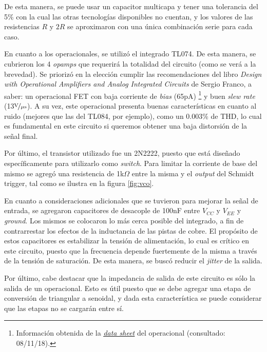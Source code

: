 \documentclass[../../tc_tp6_main.tex]{subfiles}
\begin{document}
De esta manera, se puede usar un capacitor multicapa y tener una tolerancia del 5\% con la cual las otras tecnolog\'ias disponibles no cuentan, y los valores de las resistencias $R$ y $2R$ se aproximaron con una \'unica combinaci\'on serie para cada caso.\par

En cuanto a los operacionales, se utiliz\'o el integrado TL074. De esta manera, se cubrieron los 4 \textit{opamps} que requerir\'a la totalidad del circuito (como se ver\'a a la brevedad). Se prioriz\'o en la elecci\'on cumplir las recomendaciones del libro \textit{Design with Operational Amplifiers and Analog Integrated Circuits} de Sergio Franco, a saber: un operacional FET con baja corriente de \textit{bias} (65pA) \footnote{Informaci\'on obtenida de la \href{http://www.ti.com/lit/ds/symlink/tl074.pdf}{\underline{\textit{data sheet}}} del operacional (consultado: 08/11/18).} y buen \textit{slew rate} (13$\nicefrac{\mathrm{V}}{\mu\mathrm{s}}$). A su vez, este operacional presenta buenas caracter\'isticas en cuanto al ruido (mejores que las del TL084, por ejemplo), como un 0.003\% de THD, lo cual es fundamental en este circuito si queremos obtener una baja distorsi\'on de la se\~nal final.\par 

Por \'ultimo, el transistor utilizado fue un 2N2222, puesto que est\'a dise\~nado espec\'ificamente para utilizarlo como \textit{switch}. Para limitar la corriente de base del mismo se agreg\'o una resistencia de 1k$\Omega$ entre la misma y el \textit{output} del Schmidt trigger, tal como se ilustra en la figura \ref{fig:vco}. \par

En cuanto a consideraciones adicionales que se tuvieron para mejorar la se\~nal de entrada, se agregaron capacitores de desacople de 100nF entre $V_{CC}$ y $V_{EE}$ y \textit{ground}. Los mismos se colocaron lo m\'as cerca posible del integrado, a fin de contrarrestar los efectos de la inductancia de las pistas de cobre. El prop\'osito de estos capacitores es estabilizar la tensi\'on de alimentaci\'on, lo cual es cr\'itico en este circuito, puesto que la frecuencia depende fuertemente de la misma a trav\'es de la tensi\'on de saturaci\'on. De esta manera, se busc\'o reducir el \textit{jitter} de la salida.\par

Por \'ultimo, cabe destacar que la impedancia de salida de este circuito es s\'olo la salida de un operacional. Esto es \'util puesto que se debe agregar una etapa de conversi\'on de triangular a senoidal, y dada esta caracter\'istica se puede considerar que las etapas no se cargar\'an entre s\'i. 
\end{document}
